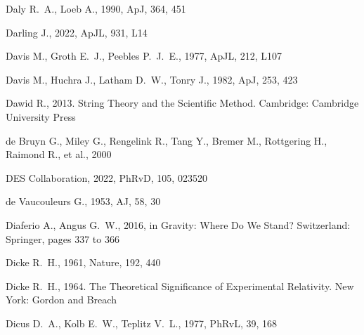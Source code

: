 \documentclass[fleqn,usenatbib]{mnras}
\begin{document}
\begin{thebibliography}{}
 Daly R.~A., Loeb A., 1990, ApJ, 364, 451


 Darling J., 2022, ApJL, 931, L14


 Davis M., Groth E.~J., Peebles P.~J.~E., 1977, ApJL, 212, L107

 Davis M., Huchra J., Latham D.~W., Tonry J., 1982, ApJ, 253, 423


 Dawid R., 2013.  String Theory and the Scientific Method. Cambridge: Cambridge University Press

 de Bruyn G., Miley G., Rengelink R., Tang Y., Bremer M., Rottgering H., Raimond R., et al., 2000

 DES Collaboration, 2022, PhRvD, 105, 023520

  de Vaucouleurs G., 1953, AJ, 58, 30

 Diaferio A., Angus G.~W., 2016, in Gravity: Where Do We Stand? Switzerland: Springer, pages 337 to 366

 Dicke R.~H., 1961, Nature, 192, 440

 Dicke R.~H., 1964. The Theoretical Significance of Experimental Relativity. New York: Gordon and Breach

 Dicus D.~A., Kolb E.~W., Teplitz V.~L., 1977, PhRvL, 39, 168
 

\end{thebibliography}
\end{document}
